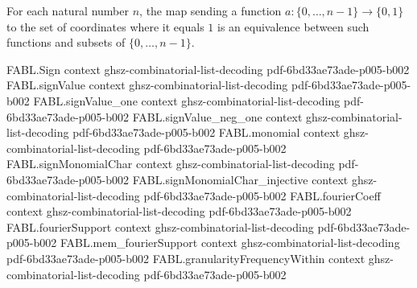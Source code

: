 \begin{definition}
\label{FABL.signMultiIndexEquivFinset}
\leanok
{}
For each natural number $n$, the map sending a function
$a\colon\{0,\ldots,n-1\}\to\{0,1\}$ to the set of coordinates where it equals $1$ is an
equivalence between such functions and subsets of $\{0,\ldots,n-1\}$.
\end{definition}

\begin{theorem}
\label{FABL.signSiteFourierBasis_fourierCoeff_eq_fourierCoeff}
\leanok
{}
\proofstep
  {FABL.Sign}
  {context}
  {ghsz-combinatorial-list-decoding}
  {pdf-6bd33ae73ade-p005-b002}
\proofstep
  {FABL.signValue}
  {context}
  {ghsz-combinatorial-list-decoding}
  {pdf-6bd33ae73ade-p005-b002}
\proofstep
  {FABL.signValue_one}
  {context}
  {ghsz-combinatorial-list-decoding}
  {pdf-6bd33ae73ade-p005-b002}
\proofstep
  {FABL.signValue_neg_one}
  {context}
  {ghsz-combinatorial-list-decoding}
  {pdf-6bd33ae73ade-p005-b002}
\proofstep
  {FABL.monomial}
  {context}
  {ghsz-combinatorial-list-decoding}
  {pdf-6bd33ae73ade-p005-b002}
\proofstep
  {FABL.signMonomialChar}
  {context}
  {ghsz-combinatorial-list-decoding}
  {pdf-6bd33ae73ade-p005-b002}
\proofstep
  {FABL.signMonomialChar_injective}
  {context}
  {ghsz-combinatorial-list-decoding}
  {pdf-6bd33ae73ade-p005-b002}
\proofstep
  {FABL.fourierCoeff}
  {context}
  {ghsz-combinatorial-list-decoding}
  {pdf-6bd33ae73ade-p005-b002}
\proofstep
  {FABL.fourierSupport}
  {context}
  {ghsz-combinatorial-list-decoding}
  {pdf-6bd33ae73ade-p005-b002}
\proofstep
  {FABL.mem_fourierSupport}
  {context}
  {ghsz-combinatorial-list-decoding}
  {pdf-6bd33ae73ade-p005-b002}
\proofstep
  {FABL.granularityFrequencyWithin}
  {context}
  {ghsz-combinatorial-list-decoding}
  {pdf-6bd33ae73ade-p005-b002}

\end{theorem}

